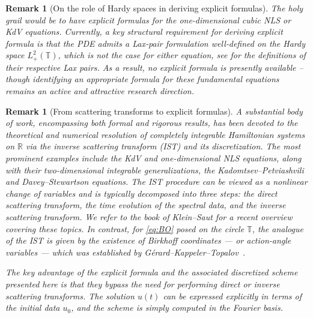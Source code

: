 \documentclass [11pt] {article}
\newtheorem{rem}[thm]{Remark}
\begin{document}
\begin{rem}[On the role of Hardy spaces in deriving explicit formulas]
The holy grail would be to have explicit formulas for the one-dimensional cubic NLS or KdV equations. Currently, a key structural requirement for deriving explicit formula is that the PDE admits a Lax‐pair formulation well‐defined on the Hardy space $L_{+}^2(\mathbb{T})$, which is not the case for either equation, see \cite[Chp. 2.4.1 and Chp. 2.3.1]{KS21} for the definitions of their respective Lax pairs.
As a result, no explicit formula is presently available -- though identifying an appropriate formula for these fundamental equations remains an active and attractive research direction.
\end{rem}

\begin{rem}[From scattering transforms to explicit formulas]
A substantial body of work, encompassing both formal and rigorous results, has been devoted to the theoretical and numerical resolution of completely integrable Hamiltonian systems on $\mathbb{R}$  via the inverse scattering transform (IST) and its discretization.
The most prominent examples include the KdV and one-dimensional NLS equations, along with their two-dimensional integrable generalizations, the Kadomtsev–Petviashvili and Davey–Stewartson equations. The IST procedure can be viewed as a nonlinear change of variables and is typically decomposed into three steps: the direct scattering transform, the time evolution of the spectral data, and the inverse scattering transform. We refer to the book of Klein--Saut \cite{KS21} for a recent overview covering these topics.
In contrast, for \eqref{eq:BO} posed on the circle $\mathbb{T}$, the analogue of the IST is given by the existence of Birkhoff coordinates --- or action-angle variables --- which was established by Gérard--Kappeler--Topalov~\cite{GKT}. 

The key advantage of the explicit formula and the associated discretized scheme presented here is that they bypass the need for performing direct or inverse scattering transforms. The solution $u(t)$ can be expressed explicitly in terms of the initial data $u_0$, and the scheme is simply computed in the Fourier basis.
\end{rem}
\end{document}
